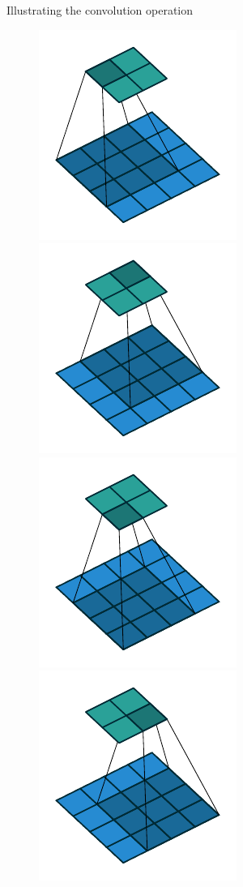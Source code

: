 \documentclass{beamer}
\begin{document}
    \begin{frame}{Illustrating the convolution operation}
        \begin{figure}
            \centering
            \includegraphics[scale=0.7]{./figures/no_padding_no_strides_00.pdf}
            \includegraphics[scale=0.7]{./figures/no_padding_no_strides_01.pdf} \\
            \includegraphics[scale=0.7]{./figures/no_padding_no_strides_02.pdf}
            \includegraphics[scale=0.7]{./figures/no_padding_no_strides_03.pdf}

\end{figure}
\end{frame}
\end{document}
